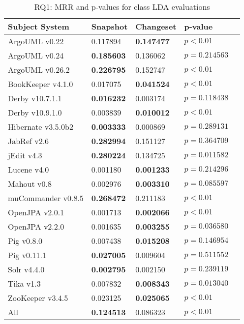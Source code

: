 
\begin{table}[t]
\renewcommand{\arraystretch}{1.3}
\footnotesize
\centering
\caption{RQ1: MRR and p-values for class LDA evaluations}
\begin{tabular}{l|ll|ll}
   \toprule
    Subject System & Snapshot & Changeset & p-value  \\
    \midrule

ArgoUML v0.22 & 0.117894 & {\bf 0.147477 } & $p < 0.01$ \\
ArgoUML v0.24 & {\bf 0.185603 } & 0.136062 & $p = 0.214563$ \\
ArgoUML v0.26.2 & {\bf 0.226795 } & 0.152747 & $p < 0.01$ \\
BookKeeper v4.1.0 & 0.017075 & {\bf 0.041524 } & $p < 0.01$ \\
Derby v10.7.1.1 & {\bf 0.016232 } & 0.003174 & $p = 0.118438$ \\
Derby v10.9.1.0 & 0.003839 & {\bf 0.010012 } & $p < 0.01$ \\
Hibernate v3.5.0b2 & {\bf 0.003333 } & 0.000869 & $p = 0.289131$ \\
JabRef v2.6 & {\bf 0.282994 } & 0.151127 & $p = 0.364709$ \\
jEdit v4.3 & {\bf 0.280224 } & 0.134725 & $p = 0.011582$ \\
Lucene v4.0 & 0.001180 & {\bf 0.001233 } & $p = 0.214296$ \\
Mahout v0.8 & 0.002976 & {\bf 0.003310 } & $p = 0.085597$ \\
muCommander v0.8.5 & {\bf 0.268472 } & 0.211183 & $p < 0.01$ \\
OpenJPA v2.0.1 & 0.001713 & {\bf 0.002066 } & $p < 0.01$ \\
OpenJPA v2.2.0 & 0.001635 & {\bf 0.003255 } & $p = 0.036580$ \\
Pig v0.8.0 & 0.007438 & {\bf 0.015208 } & $p = 0.146954$ \\
Pig v0.11.1 & {\bf 0.027005 } & 0.009604 & $p = 0.511552$ \\
Solr v4.4.0 & {\bf 0.002795 } & 0.002150 & $p = 0.239119$ \\
Tika v1.3 & 0.007832 & {\bf 0.008343 } & $p = 0.013040$ \\
ZooKeeper v3.4.5 & 0.023125 & {\bf 0.025065 } & $p < 0.01$ \\
\midrule
All & {\bf 0.124513 } & 0.086323 & $p < 0.01$ \\

    \bottomrule
\end{tabular}
\label{table:rq1:class:lda}
\end{table}

